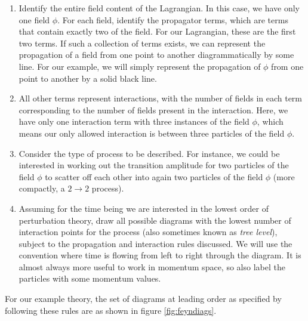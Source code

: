 \begin{enumerate}
\item{Identify the entire field content of the Lagrangian. In this case, we have only one field $\phi$. For each field, identify the propagator terms, which are terms that contain exactly two of the field. For our Lagrangian, these are the first two terms. If such a collection of terms exists, we can represent the propagation of a field from one point to another diagrammatically by some line. For our example, we will simply represent the propagation of $\phi$ from one point to another by a solid black line.}
\item{All other terms represent interactions, with the number of fields in each term corresponding to the number of fields present in the interaction. Here, we have only one interaction term with three instances of the field $\phi$, which means our only allowed interaction is between three particles of the field $\phi$.}
\item{Consider the type of process to be described. For instance, we could be interested in working out the transition amplitude for two particles of the field $\phi$ to scatter off each other into again two particles of the field $\phi$ (more compactly, a $2 \to 2$ process).}
\item{Assuming for the time being we are interested in the lowest order of perturbation theory, draw all possible diagrams with the lowest number of interaction points for the process (also sometimes known as \emph{tree level}), subject to the propagation and interaction rules discussed. We will use the convention where time is flowing from left to right through the diagram. It is almost always more useful to work in momentum space, so also label the particles with some momentum values. }
\end{enumerate}

For our example theory, the set of diagrams at leading order as specified by following these rules are as shown in figure \ref{fig:feyndiags}.  

